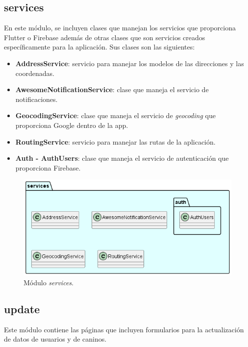 \documentclass[a4paper, 12pt]{article}
\begin{document}
\subsection*{services}

En este módulo, se incluyen clases que manejan los servicios que proporciona Flutter o Firebase además de otras clases que son servicios creados específicamente para la aplicación. Sus clases son las siguientes:

\begin{itemize}[noitemsep]
	\item \textbf{AddressService}: servicio para manejar los modelos de las direcciones y las coordenadas.
	\item \textbf{AwesomeNotificationService}: clase que maneja el servicio de notificaciones. 
	\item \textbf{GeocodingService}: clase que maneja el servicio de \textit{geocoding} que proporciona Google dentro de la app.
	\item \textbf{RoutingService}:  servicio para manejar las rutas de la aplicación.
	\item \textbf{Auth - AuthUsers}:  clase que maneja el servicio de autenticación que proporciona Firebase.
\end{itemize}



\begin{figure}[H]
	\begin{center}
		{\includegraphics[width=0.8\linewidth]{diagram/Services.png}\par}
		\caption{Módulo  \textit{services}.}
	\end{center}
\end{figure}

\subsection*{update}

Este módulo contiene las páginas que incluyen formularios para la actualización de datos de usuarios y de caninos.
\end{document}
